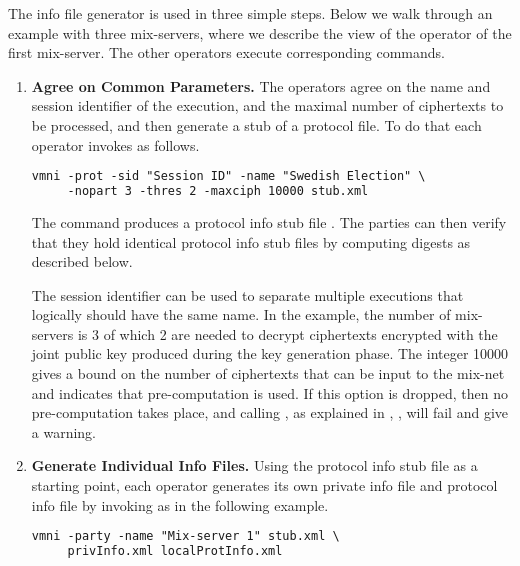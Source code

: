 \documentclass[11pt]{article}
\begin{document}
The info file generator is used in three simple steps. Below we walk
through an example with three mix-servers, where we describe the view
of the operator of the first mix-server. The other operators execute
corresponding commands.
\begin{enumerate}

\item\textbf{Agree on Common Parameters.} The operators agree on the
  name and session identifier of the execution, and the maximal number
  of ciphertexts to be processed, and then generate a stub of a
  protocol file. To do that each operator invokes \vmni{} as follows.

\vspace{0.3cm}
\begin{lstlisting}[frame=single,language=xml,
basicstyle=\tt,showstringspaces=false]
vmni -prot -sid "Session ID" -name "Swedish Election" \
     -nopart 3 -thres 2 -maxciph 10000 stub.xml
\end{lstlisting}

  The command produces a protocol info stub file . The
  parties can then verify that they hold identical protocol info stub
  files by computing digests as described below.

  The session identifier can be used to separate multiple executions
  that logically should have the same name. In the example, the number
  of mix-servers is 3 of which 2 are needed to decrypt ciphertexts
  encrypted with the joint public key produced during the key
  generation phase. The integer 10000 gives a bound on the number of
  ciphertexts that can be input to the mix-net and indicates that
  pre-computation is used. If this option is dropped, then no
  pre-computation takes place, and calling , as
  explained in \sect{mixnet}, \step{precomp}, will fail and give a
  warning.


\item\textbf{Generate Individual Info Files.} Using the protocol info
  stub file \code{stub.xml} as a starting point, each operator
  generates its own private info file and protocol info file by
  invoking \vmni{} as in the following example.

\vspace{0.3cm}
\begin{lstlisting}[frame=single,language=xml,
basicstyle=\tt,showstringspaces=false]
vmni -party -name "Mix-server 1" stub.xml \
     privInfo.xml localProtInfo.xml
\end{lstlisting}


\end{enumerate}
\end{document}
